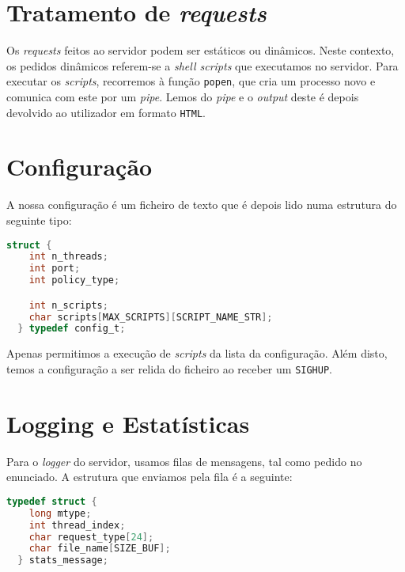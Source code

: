 \documentclass[12pt]{article}
\begin{document}
\section{Tratamento de \textit{requests}}
Os \textit{requests} feitos ao servidor podem ser estáticos ou dinâmicos. Neste
contexto, os pedidos dinâmicos referem-se a \textit{shell scripts} que executamos
no servidor. Para executar os \textit{scripts}, recorremos à função
\texttt{popen}, que cria um processo novo e comunica com este por um \textit{pipe}.
Lemos do \textit{pipe} e o \textit{output} deste é depois devolvido ao utilizador
em formato \texttt{HTML}.

\section{Configuração}
A nossa configuração é um ficheiro de texto que é depois lido numa estrutura
do seguinte tipo:

\vspace{2mm}
\begin{lstlisting}[language=C]
  struct {
    int n_threads;
    int port;
    int policy_type;

    int n_scripts;
    char scripts[MAX_SCRIPTS][SCRIPT_NAME_STR];
  } typedef config_t;
\end{lstlisting}

Apenas permitimos a execução de \textit{scripts} da lista da configuração. Além disto,
temos a configuração a ser relida do ficheiro ao receber um \texttt{SIGHUP}.

\section{Logging e Estatísticas}
Para o \textit{logger} do servidor, usamos filas de mensagens, tal como pedido
no enunciado. A estrutura que enviamos pela fila é a seguinte:

\vspace{2mm}
\begin{lstlisting}[language=C]
  typedef struct {
    long mtype;
    int thread_index;
    char request_type[24];
    char file_name[SIZE_BUF];
  } stats_message;
\end{lstlisting}
\end{document}
